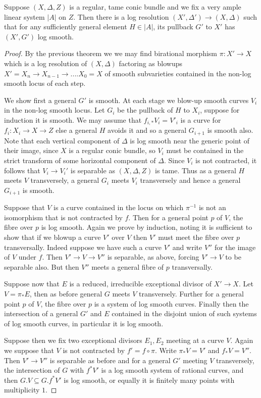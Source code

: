 \documentclass[a4paper,12pt]{book}
\begin{document}
\begin{corollary}
	Suppose $(X,\Delta,Z)$ is a regular, tame conic bundle and we fix a very ample linear system $|A|$ on $Z$.  Then there is a log resolution $(X',\Delta') \to (X,\Delta)$ such that for any sufficiently general element $H\in |A|$, its pullback $G'$ to $X'$ has $(X',G')$ log smooth.
\end{corollary}
\begin{proof}
	
	By the previous theorem we we may find birational morphism $\pi\colon X' \to X$ which is a log resolution of $(X,\Delta)$ factoring as blowups $X'=X_{n} \to X_{n-1} \to .... X_{0}=X$ of smooth subvarieties contained in the non-log smooth locus of each step.
	
	We show first a general $G'$ is smooth. At each stage we blow-up smooth curves $V_{i}$ in the non-log smooth locus. Let $G_{i}$ be the pullback of $H$ to $X_{i}$, suppose for induction it is smooth. We may assume that $f_{i,*}V_{i}=V'_{i}$ is a curve for $f_{i}\colon X_{i} \to X \to Z$ else a general $H$ avoids it and so a general $G_{i+1}$ is smooth also. Note that each vertical component of $\Delta$ is log smooth near the generic point of their image, since $X$ is a regular conic bundle, so $V_{i}$ must be contained in the strict transform of some horizontal component of $\Delta$. Since $V_{i}$ is not contracted, it follows that $V_{i} \to V_{i}'$ is separable as $(X,\Delta,Z)$ is tame. Thus as a general $H$ meets $V$ transversely, a general $G_{i}$ meets $V_{i}$ transversely and hence a general $G_{i+1}$ is smooth.
	
	Suppose that $V$ is a curve contained in the locus on which $\pi^{-1}$ is not an isomorphism that is not contracted by $f$. Then for a general point $p$ of $V$, the fibre over $p$ is log smooth. Again we prove by induction, noting it is sufficient to show that if we blowup a curve $V'$ over $V$ then $V'$ must meet the fibre over $p$ transversally. Indeed suppose we have such a curve $V'$ and write $V''$ for the image of $V$ under $f$. Then $V' \to V \to V''$ is separable, as above, forcing $V' \to V$ to be separable also. But then $V''$ meets a general fibre of $p$ transversally.
	
	Suppose now that $E$ is a reduced, irreducible exceptional divisor of $X'\to X$. Let $V=\pi_{*}E$, then as before general $G$ meets $V$ transversely. Further for a general point $p$ of $V$, the fibre over $p$ is a system of log smooth curves. Finally then the intersection of a general $G'$ and $E$ contained in the disjoint union of such systems of log smooth curves, in particular it is log smooth. 
	
	Suppose then we fix two exceptional divisors $E_{1},E_{2}$ meeting at a curve $V$. Again we suppose that $V$ is not contracted by $f'=f \circ \pi$. Write $\pi_{*}V=V'$ and $f_{*}V=V''$. Then $V' \to V''$ is separable as before and for a general $G'$ meeting $V$ transversely, the intersection of $G$ with $f^{*}V'$ is a log smooth system of rational curves, and then $G.V \subseteq G.f^{*}V'$ is log smooth, or equally it is finitely many points with multiplicity $1$. 
\end{proof}
\end{document}
